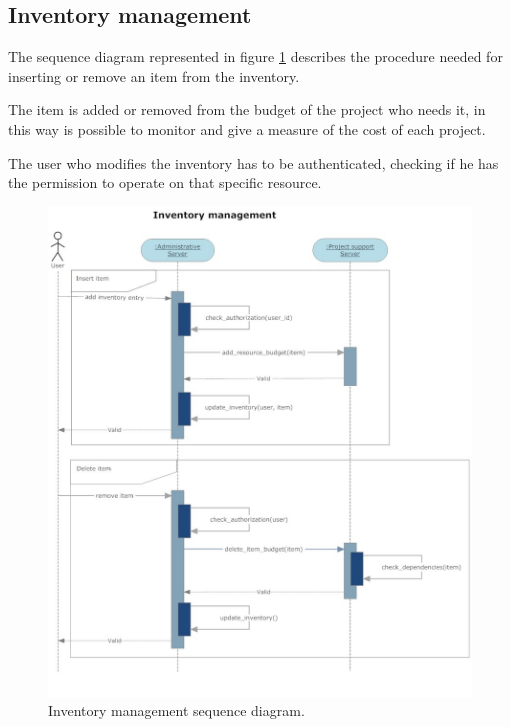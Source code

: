 \subsection{Inventory management}
The sequence diagram represented in figure \ref{3img:[sequence]inventory}
describes the procedure needed for inserting or remove an item from the
inventory.

The item is added or removed from the budget of the project who needs it,
in this way is possible to monitor and give a measure of the cost of each
project.

The user who modifies the inventory has to be authenticated, checking if
he has the permission to operate on that specific resource.

\begin{figure}[H]
\begin{centering}
\includegraphics[scale=0.45]{assign3/sdraw/imgs/inventory.jpg}
\caption{Inventory management sequence diagram.}
\label{3img:[sequence]inventory}
\end{centering}
\end{figure}
